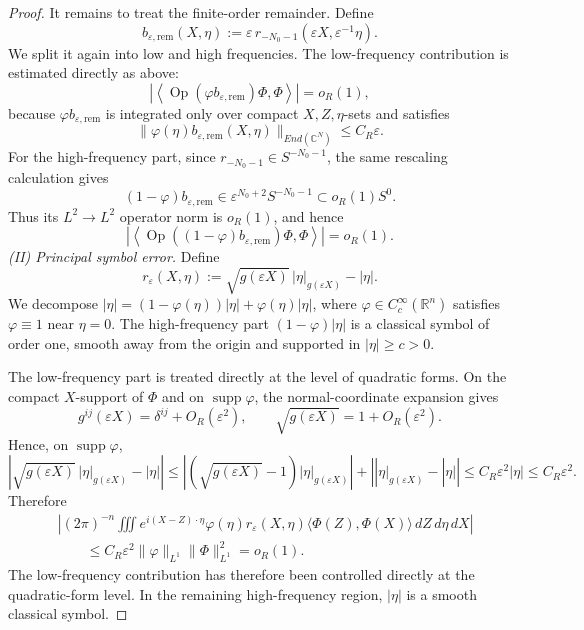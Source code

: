 \documentclass[a4paper, 12pt]{article}
\begin{document}
\begin{proof}
	It remains to treat the finite-order remainder. Define
	\[
	b_{\varepsilon,\mathrm{rem}}(X,\eta)
	:=
	\varepsilon\,r_{-N_0-1}(\varepsilon X,\varepsilon^{-1}\eta).
	\]
	We split it again into low and high frequencies. The low-frequency contribution
	is estimated directly as above:
	\[
	\left|
	\left\langle
	\operatorname{Op}(\varphi b_{\varepsilon,\mathrm{rem}})\Phi,\Phi
	\right\rangle
	\right|
	=o_R(1),
	\]
	because \(\varphi b_{\varepsilon,\mathrm{rem}}\) is integrated only over compact
	\(X,Z,\eta\)-sets and satisfies
	\[
	\|\varphi(\eta)b_{\varepsilon,\mathrm{rem}}(X,\eta)\|_{End(\mathbb{C}^N)}
	\le C_R\varepsilon .
	\]
	For the high-frequency part, since \(r_{-N_0-1}\in S^{-N_0-1}\), the same
	rescaling calculation gives
	\[
	(1-\varphi)b_{\varepsilon,\mathrm{rem}}
	\in
	\varepsilon^{N_0+2}S^{-N_0-1}
	\subset	o_R(1)S^0.
	\]
	Thus its \(L^2\to L^2\) operator norm is \(o_R(1)\), and hence
	\[
	\left|
	\left\langle
	\operatorname{Op}((1-\varphi)b_{\varepsilon,\mathrm{rem}})\Phi,\Phi
	\right\rangle
	\right|
	=o_R(1).
	\]
	\smallskip
	\noindent\emph{(II) Principal symbol error.}
	Define
	\[
	r_\varepsilon(X,\eta) := \sqrt{g(\varepsilon X)}\,|\eta|_{g(\varepsilon X)} - |\eta|.
	\]
	We decompose $|\eta| = (1-\varphi(\eta))|\eta| + \varphi(\eta)|\eta|$, where
	$\varphi \in C_c^\infty(\mathbb{R}^n)$ satisfies $\varphi \equiv 1$ near
	$\eta = 0$. The high-frequency part $(1-\varphi)|\eta|$ is a classical symbol
	of order one, smooth away from the origin and supported in $|\eta| \ge c > 0$.
	
	The low-frequency part is treated directly at the level of quadratic forms.
	On the compact \(X\)-support of \(\Phi\) and on \(\operatorname{supp}\varphi\),
	the normal-coordinate expansion gives
	\[
	g^{ij}(\varepsilon X)=\delta^{ij}+O_R(\varepsilon^2),
	\qquad
	\sqrt{g(\varepsilon X)}=1+O_R(\varepsilon^2).
	\]
	Hence, on $\operatorname{supp}\varphi$,
	\[
	\left|	\sqrt{g(\varepsilon X)}\,|\eta|_{g(\varepsilon X)}-|\eta|
	\right|\leq \left| {(\sqrt {g(\varepsilon X)}  - 1)|\eta {|_{g(\varepsilon X)}}} \right| + \left| {|\eta {|_{g(\varepsilon X)}} - |\eta |} \right|	\le C_R\varepsilon^2|\eta|
	\le C_R\varepsilon^2.
	\]
	Therefore
	\[
	\begin{aligned}
		&\left|	(2\pi)^{-n}	\iiint
		e^{i(X-Z)\cdot\eta}
		\varphi(\eta)	r_\varepsilon(X,\eta)
		\langle \Phi(Z),\Phi(X)\rangle
		\,dZ\,d\eta\,dX	\right| \\
		&\qquad\le	C_R\varepsilon^2
		\|\varphi\|_{L^1}\|\Phi\|_{L^1}^2
		=o_R(1).
	\end{aligned}
	\] 
	The low-frequency contribution has therefore been controlled directly at the
	quadratic-form level. In the remaining high-frequency region, \(|\eta|\) is a
	smooth classical symbol. 
	

\end{proof}
\end{document}
